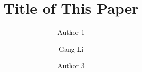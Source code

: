 \documentclass{amsart}
\begin{document}
%
%
\title[A Short Running Title]{Title of This Paper}%

\author{Author 1}
\address[A.~1]{School of Computer Science,\\ 
Xi'an Shiyou University, Shaanxi 710065, China}%

\author{Gang Li}
\address[A.~2]{School of Information Technology \\
Deakin University, Geelong, Australia}%

\author{Author 3}
\address[A.~3]{School of Information Technology \\
Deakin University, 221 Burwood Highway \\
Vic 3125, Australia}%

%


\date{\gitAuthorDate}%




\maketitle
\tableofcontents

\newpage



\newpage



\listoftodos
\end{document}
